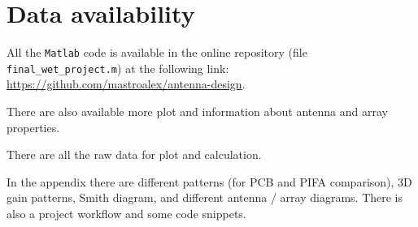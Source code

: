 \documentclass[10 pt,a4paper,twocolumn]{article}
\begin{document}
{\section*{Data availability}

All the \texttt{Matlab} code is available in the online repository (file \texttt{final\_wet\_project.m}) at the following link: \url{https://github.com/mastroalex/antenna-design}.

There are also available more plot and information about antenna and array properties. 

There are all the raw data for plot and calculation.

In the appendix there are different patterns (for PCB and PIFA comparison), 3D gain patterns, Smith diagram, and different antenna / array diagrams. There is also a project workflow and some code snippets. 

		\printbibliography

\pagebreak
\appendix

	

}
\end{document}
